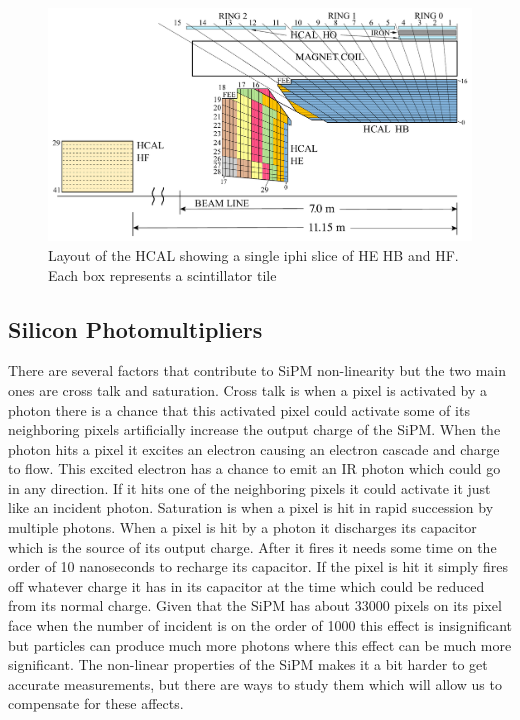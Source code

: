 \begin{figure}
\centering
\includegraphics[width=\linewidth]{Depthsegmentation.pdf}
\caption{Layout of the HCAL showing a single iphi slice of HE HB and HF. Each box represents a scintillator tile}
\label{fig:Depth}
\end{figure}

\subsection{Silicon Photomultipliers}
There are several factors that contribute to SiPM non-linearity but the two main ones are cross talk and saturation. Cross talk is when a pixel is activated by a photon there is a chance that this activated pixel could activate some of its neighboring pixels artificially increase the output charge of the SiPM. When the photon hits a pixel it excites an electron causing an electron cascade and charge to flow. This excited electron has a chance to emit an IR photon which could go in any direction. If it hits one of the neighboring pixels it could activate it just like an incident photon. Saturation is when a pixel is hit in rapid succession by multiple photons. When a pixel is hit by a photon it discharges its capacitor which is the source of its output charge. After it fires it needs some time on the order of 10 nanoseconds to recharge its capacitor. If the pixel is hit it simply fires off whatever charge it has in its capacitor at the time which could be reduced from its normal charge. Given that the SiPM has about 33000 pixels on its pixel face when the number of incident is on the order of 1000 this effect is insignificant but particles can produce much more photons where this effect can be much more significant. The non-linear properties of the SiPM makes it a bit harder to get accurate measurements, but there are ways to study them which will allow us to compensate for these affects.

